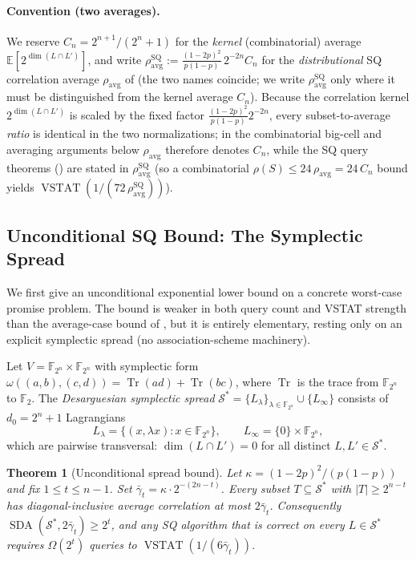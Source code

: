 \documentclass[11pt,a4paper]{article}
\theoremstyle{plain}
\newtheorem{theorem}{Theorem}[section]
\theoremstyle{definition}
\newcommand{\F}{\mathbb{F}}
\newcommand{\E}{\mathbb{E}}
\DeclareMathOperator{\SDA}{SDA}
\DeclareMathOperator{\VSTAT}{VSTAT}
\begin{document}
\paragraph{Convention (two averages).}\label{conv:two-averages}
We reserve $C_n=2^{n+1}/(2^n+1)$ for the \emph{kernel} (combinatorial) average $\E[2^{\dim(L\cap L')}]$, and write $\rho_{\mathrm{avg}}^{\mathrm{SQ}}:=\tfrac{(1-2p)^2}{p(1-p)}\,2^{-2n}C_n$ for the \emph{distributional} SQ correlation average $\rho_{\mathrm{avg}}$ of  (the two names coincide; we write $\rho_{\mathrm{avg}}^{\mathrm{SQ}}$ only where it must be distinguished from the kernel average $C_n$). Because the correlation kernel $2^{\dim(L\cap L')}$ is scaled by the fixed factor $\tfrac{(1-2p)^2}{p(1-p)}2^{-2n}$, every subset-to-average \emph{ratio} is identical in the two normalizations; in the combinatorial big-cell and averaging arguments below $\rho_{\mathrm{avg}}$ therefore denotes $C_n$, while the SQ query theorems () are stated in $\rho_{\mathrm{avg}}^{\mathrm{SQ}}$ (so a combinatorial $\rho(S)\le 24\,\rho_{\mathrm{avg}}=24\,C_n$ bound yields $\VSTAT(1/(72\,\rho_{\mathrm{avg}}^{\mathrm{SQ}}))$).

\subsection{Unconditional SQ Bound: The Symplectic Spread}
\label{subsec:spread-bound}

We first give an unconditional exponential lower bound on a concrete worst-case promise problem. The bound is weaker in both query count and VSTAT strength than the average-case bound of , but it is entirely elementary, resting only on an explicit symplectic spread (no association-scheme machinery).

Let $V = \F_{2^n} \times \F_{2^n}$ with symplectic form $\omega((a,b),(c,d)) = \operatorname{Tr}(ad) + \operatorname{Tr}(bc)$, where $\operatorname{Tr}$ is the trace from $\F_{2^n}$ to $\F_2$. The \emph{Desarguesian symplectic spread} $\mathcal{S}^* = \{L_\lambda\}_{\lambda \in \F_{2^n}} \cup \{L_\infty\}$ consists of $d_0 = 2^n+1$ Lagrangians
\[
L_\lambda = \{(x, \lambda x) : x \in \F_{2^n}\}, \qquad L_\infty = \{0\} \times \F_{2^n},
\]
which are pairwise transversal: $\dim(L \cap L') = 0$ for all distinct $L, L' \in \mathcal{S}^*$.

\begin{theorem}[Unconditional spread bound]
\label{thm:main-sq-uncond}
Let $\kappa = (1-2p)^2/(p(1-p))$ and fix $1 \leq t \leq n-1$. Set $\bar\gamma_t = \kappa \cdot 2^{-(2n-t)}$. Every subset $T \subseteq \mathcal{S}^*$ with $|T| \geq 2^{n-t}$ has diagonal-inclusive average correlation at most $2\bar\gamma_t$. Consequently $\SDA(\mathcal{S}^*, 2\bar\gamma_t) \geq 2^t$, and any SQ algorithm that is correct on every $L \in \mathcal{S}^*$ requires $\Omega(2^t)$ queries to $\VSTAT(1/(6\bar\gamma_t))$.
\end{theorem}
\end{document}
